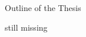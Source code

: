 \clearemptydoublepage

{}

\begin{center}
	\huge{Outline of the Thesis}
\end{center}

\noindent  still missing

%
%
%
%
%
%
%
